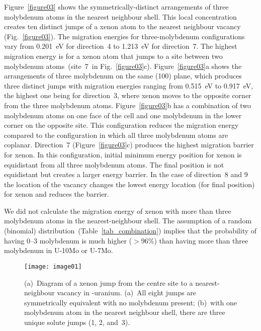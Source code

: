 Figure~\ref{figure03} shows the symmetrically-distinct arrangements of three
molybdenum atoms in the nearest neighbour shell.
This local concentration creates ten distinct jumps of a xenon atom to the
nearest neighbour vacancy (Fig.~\ref{figure03}).
The migration energies for three-molybdenum configurations vary from 0.201~eV
for direction~4 to 1.213~eV for direction~7.
The highest migration energy is for a xenon atom that jumps to a site between
two molybdenum atoms~(site~7\ in Fig.~\ref{figure03}c).
Figure~\ref{figure03}a shows the arrangements of three molybdenum on the same
\hkl(100) plane, which produces three distinct jumps with migration energies
ranging from 0.515~eV to 0.917~eV, the highest one being for direction~3,
where xenon moves to the opposite corner from the three molybdenum atoms.
Figure~\ref{figure03}b has a combination of two molybdenum atoms on one face of
the cell and one molybdenum in the lower corner on the opposite site. 
This configuration reduces the migration energy compared to the configuration
in which all three molybdenum atoms are coplanar. Direction~7 (Figure~\ref{figure03}c) produces the highest migration barrier for xenon. 
In this configuration, initial minimum energy position for xenon is equidistant
from all three molybdenum atoms. The final position is not equidistant but creates a larger energy barrier. In the case of direction~8 and 9 the location of the vacancy 
changes the lowest energy location (for final position) for xenon and reduces the barrier.
 

We did not calculate the migration energy of xenon with more than three
molybdenum atoms in the nearest-neighbour shell.
The assumption of a random (binomial)
distribution~(Table~\ref{tab_combination}) implies that the
probability of having 0--3 molybdenum is much higher ($> 96\%$) than having
more than three molybdenum in U-10Mo or U-7Mo.


\begin{figure}
  \centering
  \texttt{[image: image01]}
	\caption{(a)~Diagram of a xenon jump from the centre site to a
    nearest-neighbour vacancy in \textgamma-uranium.
    (a)~All eight jumps are symmetrically equivalent with no molybdenum
    present;
    (b)~with one molybdenum atom in the nearest neighbour shell, there are
        three unique solute jumps (1, 2, and~3).}
      \label{figure01}
\end{figure}

